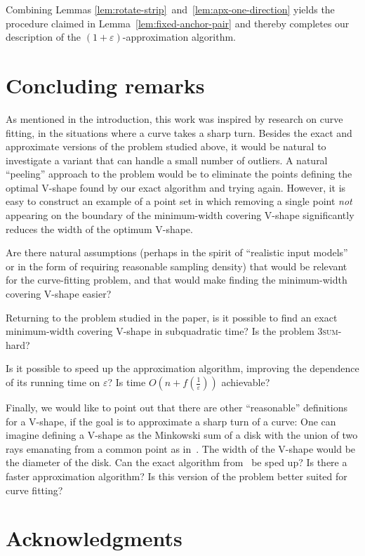 \documentclass{llncs}
\let\eps\varepsilon
\begin{document}
Combining Lemmas
\ref{lem:rotate-strip}~and~\ref{lem:apx-one-direction} yields the
procedure claimed in Lemma~\ref{lem:fixed-anchor-pair} and thereby
completes our description of the $(1+\eps)$-approximation algorithm.



\section{Concluding remarks}\label{sec:conclusion}

As mentioned in the introduction, this work was inspired by research
on curve fitting, in the situations where a curve takes a sharp turn.
Besides the exact and approximate versions of the problem studied
above, it would be natural to investigate a variant that can handle 
a small number of outliers.  A natural ``peeling''
approach to the problem would be to eliminate the points defining the
optimal V-shape found by our exact algorithm and trying again.
However, it is easy to construct an example of a point set in which
removing a single point \emph{not} appearing on the boundary of the
minimum-width covering V-shape significantly reduces the width of the
optimum V-shape.


Are there natural assumptions (perhaps in the spirit of ``realistic
input models''~\cite{realistic-input-models} or in the form of
requiring reasonable sampling density) that would be relevant for the
curve-fitting problem, and that would make finding the minimum-width covering
V-shape easier?

Returning to the problem studied in the paper, is it possible to find
an exact minimum-width covering V-shape in subquadratic time?  Is the
problem \textsc{3sum}-hard?  

Is it possible to speed up the approximation algorithm, improving the
dependence of its running time on $\eps$?
Is time $O( n + f(\frac{1}{\eps}))$ achievable?

Finally, we would like to point out that there are other
``reasonable'' definitions for a V-shape, if the goal is to
approximate a sharp turn of a curve: One can imagine defining a
V-shape as the Minkowski sum of a disk with the union of two rays
emanating from a common point as in~\cite{GKS}.  
The width of the
V-shape would be the diameter of the disk.  Can the exact algorithm
from~\cite{GKS} be sped up?  Is there a faster approximation
algorithm?  Is this version of the problem better suited for curve
fitting?

\section*{Acknowledgments}
\end{document}
